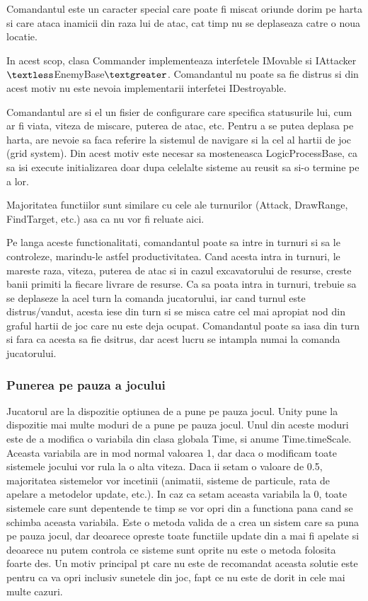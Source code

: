 \documentclass[12pt, a4paper]{article}
\begin{document}
	Comandantul este un caracter special care poate fi miscat oriunde dorim pe harta si care ataca inamicii din raza lui de atac, cat timp nu se deplaseaza catre o noua locatie.
	
	In acest scop, clasa Commander implementeaza interfetele IMovable si IAttacker$\textless$EnemyBase$\textgreater$. Comandantul nu poate sa fie distrus si din acest motiv nu este nevoia implementarii interfetei IDestroyable.
	
	Comandantul are si el un fisier de configurare care specifica statusurile lui, cum ar fi viata, viteza de miscare, puterea de atac, etc. Pentru a se putea deplasa pe harta, are nevoie sa faca referire la sistemul de navigare si la cel al hartii de joc (grid system). Din acest motiv este necesar sa mosteneasca LogicProcessBase, ca sa isi execute initializarea doar dupa celelalte sisteme au reusit sa si-o termine pe a lor.
	
	Majoritatea functiilor sunt similare cu cele ale turnurilor (Attack, DrawRange, FindTarget, etc.) asa ca nu vor fi reluate aici. 
	
	Pe langa aceste functionalitati, comandantul poate sa intre in turnuri si sa le controleze, marindu-le astfel productivitatea. Cand acesta intra in turnuri, le mareste raza, viteza, puterea de atac si in cazul excavatorului de resurse, creste banii primiti la fiecare livrare de resurse. Ca sa poata intra in turnuri, trebuie sa se deplaseze la acel turn la comanda jucatorului, iar cand turnul este distrus/vandut, acesta iese din turn si se misca catre cel mai apropiat nod din graful hartii de joc care nu este deja ocupat. Comandantul poate sa iasa din turn si fara ca acesta sa fie dsitrus, dar acest lucru se intampla numai la comanda jucatorului.
	
	\subsubsection{Punerea pe pauza a jocului}
	
	Jucatorul are la dispozitie optiunea de a pune pe pauza jocul. Unity pune la dispozitie mai multe moduri de a pune pe pauza jocul. Unul din aceste moduri este de a modifica o variabila din clasa globala Time, si anume Time.timeScale. Aceasta variabila are in mod normal valoarea 1, dar daca o modificam toate sistemele jocului vor rula la o alta viteza. Daca ii setam o valoare de 0.5, majoritatea sistemelor vor incetinii (animatii, sisteme de particule, rata de apelare a metodelor update, etc.). In caz ca setam aceasta variabila la 0, toate sistemele care sunt depentende te timp se vor opri din a functiona pana cand se schimba aceasta variabila. Este o metoda valida de a crea un sistem care sa puna pe pauza jocul, dar deoarece opreste toate functiile update din a mai fi apelate si deoarece nu putem controla ce sisteme sunt oprite nu este o metoda folosita foarte des. Un motiv principal pt care nu este de recomandat aceasta solutie este pentru ca va opri inclusiv sunetele din joc, fapt ce nu este de dorit in cele mai multe cazuri.
	
\end{document}
